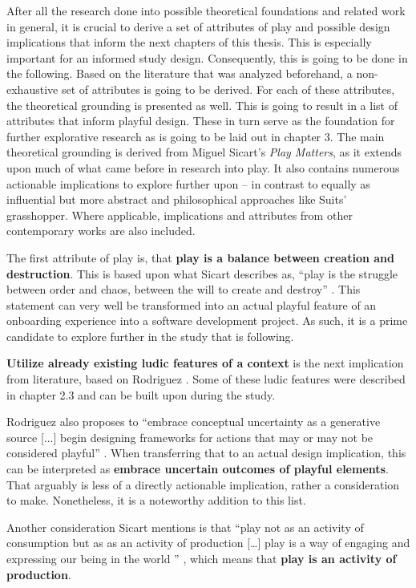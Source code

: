 After all the research done into possible theoretical foundations and related work in general, it is crucial to derive a set of attributes of play and possible design implications that inform the next chapters of this thesis. This is especially important for an informed study design. Consequently, this is going to be done in the following. Based on the literature that was analyzed beforehand, a non-exhaustive set of attributes is going to be derived. For each of these attributes, the theoretical grounding is presented as well. This is going to result in a list of attributes that inform playful design. These in turn serve as the foundation for further explorative research as is going to be laid out in chapter 3. The main theoretical grounding is derived from Miguel Sicart's \textit{Play Matters}, as it extends upon much of what came before in research into play. It also contains numerous actionable implications to explore further upon -- in contrast to equally as influential but more abstract and philosophical approaches like Suits' grasshopper. Where applicable, implications and attributes from other contemporary works are also included.

The first attribute of play is, that \textbf{play is a balance between creation and destruction}. This is based upon what Sicart describes as, \enquote{play is the struggle between order and chaos, between the will to create and destroy} \cite[p. 5]{sicart2014play}. This statement can very well be transformed into an actual playful feature of an onboarding experience into a software development project. As such, it is a prime candidate to explore further in the study that is following.

\textbf{Utilize already existing ludic features of a context} is the next implication from literature, based on Rodriguez \cite{rodriguez2006playful}. Some of these ludic features were described in chapter 2.3 and can be built upon during the study.

Rodriguez also proposes to \enquote{embrace conceptual uncertainty as a generative source [...] begin designing frameworks for actions that may or may not be considered playful} \cite{rodriguez2006playful}. When transferring that to an actual design implication, this can be interpreted as \textbf{embrace uncertain outcomes of playful elements}. That arguably is less of a directly actionable implication, rather a consideration to make. Nonetheless, it is a noteworthy addition to this list.

Another consideration Sicart mentions is that \enquote{play not as an activity of consumption but as as an activity of production […] play is a way of engaging and expressing our being in the world } \cite[p. 5]{sicart2014play}, which means that \textbf{play is an activity of production}.

